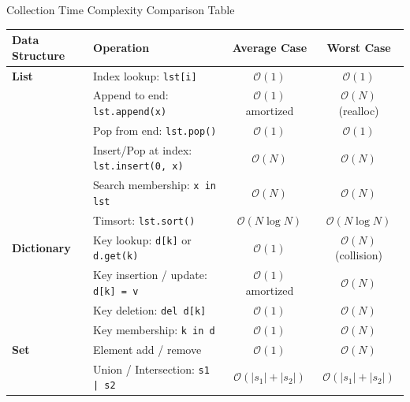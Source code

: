 \begin{formulabox}{Collection Time Complexity Comparison Table}
\begin{center}
\begin{tabularx}{0.96\textwidth}{l X c c}
\toprule
\textbf{Data Structure} & \textbf{Operation} & \textbf{Average Case} & \textbf{Worst Case} \\
\midrule
\textbf{List} & Index lookup: \texttt{lst[i]} & $\mathcal{O}(1)$ & $\mathcal{O}(1)$ \\
& Append to end: \texttt{lst.append(x)} & $\mathcal{O}(1)$ amortized & $\mathcal{O}(N)$ (realloc) \\
& Pop from end: \texttt{lst.pop()} & $\mathcal{O}(1)$ & $\mathcal{O}(1)$ \\
& Insert/Pop at index: \texttt{lst.insert(0, x)} & $\mathcal{O}(N)$ & $\mathcal{O}(N)$ \\
& Search membership: \texttt{x in lst} & $\mathcal{O}(N)$ & $\mathcal{O}(N)$ \\
& Timsort: \texttt{lst.sort()} & $\mathcal{O}(N \log N)$ & $\mathcal{O}(N \log N)$ \\
\midrule
\textbf{Dictionary} & Key lookup: \texttt{d[k]} or \texttt{d.get(k)} & $\mathcal{O}(1)$ & $\mathcal{O}(N)$ (collision) \\
& Key insertion / update: \texttt{d[k] = v} & $\mathcal{O}(1)$ amortized & $\mathcal{O}(N)$ \\
& Key deletion: \texttt{del d[k]} & $\mathcal{O}(1)$ & $\mathcal{O}(N)$ \\
& Key membership: \texttt{k in d} & $\mathcal{O}(1)$ & $\mathcal{O}(N)$ \\
\midrule
\textbf{Set} & Element add / remove & $\mathcal{O}(1)$ & $\mathcal{O}(N)$ \\
& Union / Intersection: \texttt{s1 | s2} & $\mathcal{O}(|s_1| + |s_2|)$ & $\mathcal{O}(|s_1| + |s_2|)$ \\
\bottomrule
\end{tabularx}
\end{center}
\end{formulabox}

